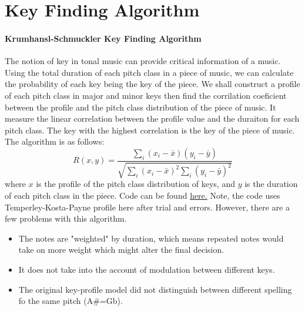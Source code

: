 \section*{Key Finding Algorithm}
\paragraph*{Krumhansl-Schmuckler Key Finding Algorithm}
The notion of key in tonal music can provide critical information of a music. Using the total duration
of each pitch class in a piece of music, we can calculate the probability of each key being the key of the
piece. We shall construct a profile of each pitch class in major and minor keys 
then find the corrilation coeficient between the profile and the pitch class distribution of the piece of music.
It measure the linear correlation between the profile value and the duraiton for each pitch class.
The key with the highest correlation is the key of the piece of music. The algorithm is as follows:
\[R(x,y)=\frac{\sum_i(x_i-\bar{x})(y_i-\bar{y})}{\sqrt{\sum_i(x_i-\bar{x})^2\sum_i(y_i-\bar{y})^2}}\]
where $x$ is the profile of the pitch class distribution of keys, and $y$ is 
the duration of each pitch class in the piece. Code can be found 
\href{https://github.com/StefanHeng/Symbolic-Music-Generation/blob/master/musicnlp/preprocess/key_finder.py}{here.}
Note, the code uses Temperley-Kosta-Payne profile here after trial and errors.
However, there are a few problems with this algorithm.
\begin{itemize}
    \item The notes are "weighted" by duration, which means repeated notes would take
    on more weight which might alter the final decision.
    \item It does not take into the account of modulation between different keys.
    \item The original key-profile model did not distinguish between different spelling fo
    the same pitch (A\#=Gb).
\end{itemize}
